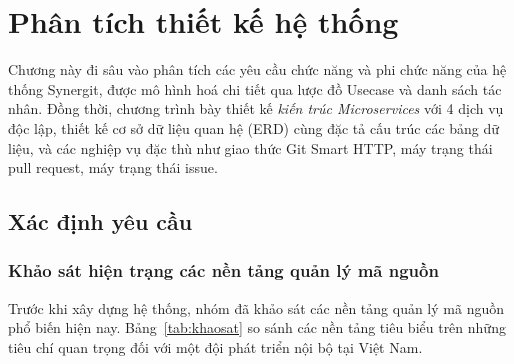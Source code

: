 \chapter{Phân tích thiết kế hệ thống}

Chương này đi sâu vào phân tích các yêu cầu chức năng và phi chức năng của hệ thống Synergit, được mô hình hoá chi tiết qua lược đồ Usecase và danh sách tác nhân. Đồng thời, chương trình bày thiết kế \textit{kiến trúc Microservices} với 4 dịch vụ độc lập, thiết kế cơ sở dữ liệu quan hệ (ERD) cùng đặc tả cấu trúc các bảng dữ liệu, và các nghiệp vụ đặc thù như giao thức Git Smart HTTP, máy trạng thái pull request, máy trạng thái issue.

\section{Xác định yêu cầu}

\subsection{Khảo sát hiện trạng các nền tảng quản lý mã nguồn}
Trước khi xây dựng hệ thống, nhóm đã khảo sát các nền tảng quản lý mã nguồn phổ biến hiện nay. Bảng~\ref{tab:khaosat} so sánh các nền tảng tiêu biểu trên những tiêu chí quan trọng đối với một đội phát triển nội bộ tại Việt Nam.

